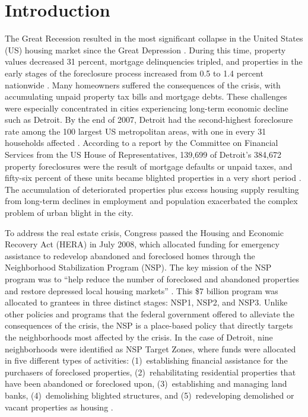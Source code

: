 \documentclass[12pt,authoryear]{elsarticle}
\begin{document}
\doublespacing

\section{Introduction}
\label{sec:introduction}

The Great Recession resulted in the most significant collapse in the United States (US) housing market since the Great Depression \citep{wangimmergluck2018}. During this time, property values decreased 31 percent, mortgage delinquencies tripled, and properties in the early stages of the foreclosure process increased from 0.5 to 1.4 percent nationwide \citep{joice2011}. Many homeowners suffered the consequences of the crisis, with accumulating unpaid property tax bills and mortgage debts. These challenges were especially concentrated in cities experiencing long-term economic decline such as Detroit. By the end of 2007, Detroit had the second-highest foreclosure rate among the 100 largest US metropolitan areas, with one in every 31 households affected \citep{realtytrac2007}. According to a report by the Committee on Financial Services from the US House of Representatives, 139,699 of Detroit's 384,672 property foreclosures were the result of mortgage defaults or unpaid taxes, and fifty-six percent of these units became blighted properties in a very short period \citep{committeefinancialservices2019}. The accumulation of deteriorated properties plus excess housing supply resulting from long-term declines in employment and population \citep{alm2014} exacerbated the complex problem of urban blight in the city.

To address the real estate crisis, Congress passed the Housing and Economic Recovery Act (HERA) in July 2008, which allocated funding for emergency assistance to redevelop abandoned and foreclosed homes through the Neighborhood Stabilization Program (NSP). The key mission of the NSP program was to ``help reduce the number of foreclosed and abandoned properties and restore depressed local housing markets'' \citep[p.~2]{gao2010}. This \$7 billion program was allocated to grantees in three distinct stages: NSP1, NSP2, and NSP3. Unlike other policies and programs that the federal government offered to alleviate the consequences of the crisis, the NSP is a place-based policy that directly targets the neighborhoods most affected by the crisis. In the case of Detroit, nine neighborhoods were identified as NSP Target Zones, where funds were allocated in five different types of activities: (1)~establishing financial assistance for the purchasers of foreclosed properties, (2)~rehabilitating residential properties that have been abandoned or foreclosed upon, (3)~establishing and managing land banks, (4)~demolishing blighted structures, and (5)~redeveloping demolished or vacant properties as housing \citep{spader2015}.
\end{document}
